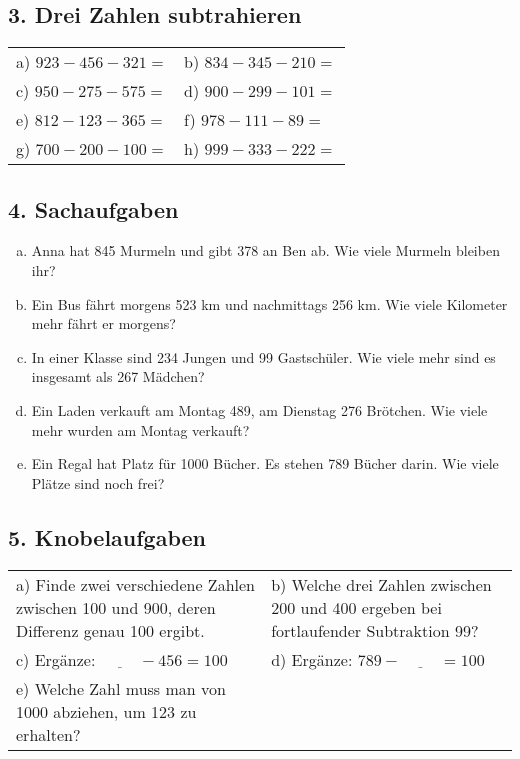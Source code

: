 \vspace{0.5cm}

\subsection*{3. Drei Zahlen subtrahieren}
\noindent
\begin{tabular}{p{} p{}}
 a) $923 - 456 - 321 =$ & b) $834 - 345 - 210 =$ \\
 c) $950 - 275 - 575 =$ & d) $900 - 299 - 101 =$ \\
 e) $812 - 123 - 365 =$ & f) $978 - 111 - 89 =$ \\
 g) $700 - 200 - 100 =$ & h) $999 - 333 - 222 =$ \\
\end{tabular}

\vspace{0.5cm}

\subsection*{4. Sachaufgaben}
\begin{enumerate}[a)]
    \item Anna hat 845 Murmeln und gibt 378 an Ben ab. Wie viele Murmeln bleiben ihr?
    \item Ein Bus fährt morgens 523 km und nachmittags 256 km. Wie viele Kilometer mehr fährt er morgens?
    \item In einer Klasse sind 234 Jungen und 99 Gastschüler. Wie viele mehr sind es insgesamt als 267 Mädchen?
    \item Ein Laden verkauft am Montag 489, am Dienstag 276 Brötchen. Wie viele mehr wurden am Montag verkauft?
    \item Ein Regal hat Platz für 1000 Bücher. Es stehen 789 Bücher darin. Wie viele Plätze sind noch frei?
\end{enumerate}

\vspace{0.5cm}

\subsection*{5. Knobelaufgaben}
\noindent
\begin{tabular}{p{} p{}}
 a) Finde zwei verschiedene Zahlen zwischen 100 und 900, deren Differenz genau 100 ergibt. &
 b) Welche drei Zahlen zwischen 200 und 400 ergeben bei fortlaufender Subtraktion 99? \\
 c) Ergänze: $\underline{\hspace{1cm}} - 456 = 100$ &
 d) Ergänze: $789 - \underline{\hspace{1cm}} = 100$ \\
 e) Welche Zahl muss man von 1000 abziehen, um 123 zu erhalten? & \\
\end{tabular}

